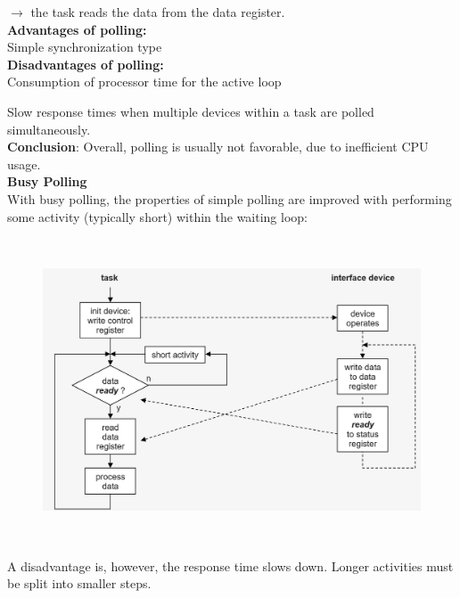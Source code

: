 $\rightarrow$ the task reads the data from the data register.\\

\textbf{Advantages of polling:}\\

\hspace{1cm} Simple synchronization type\\

\textbf{Disadvantages of polling:}\\

\hspace{1cm} Consumption of processor time for the active loop

\hspace{1cm} Slow response times when multiple devices within a task are polled simultaneously.\\

\textbf{Conclusion}: Overall, polling is usually not favorable, due to inefficient CPU usage.\\

\textbf{Busy Polling}\\

With busy polling, the properties of simple polling are improved with performing some activity (typically short) within the waiting loop:

 	\begin{figure}[h]
    \centering
    \includegraphics[width=14cm, height=9cm]{Images/image124.png}
    \label{fig:Fig }
    \end{figure}

A disadvantage is, however, the response time slows down. Longer activities must be split into smaller steps.\\

